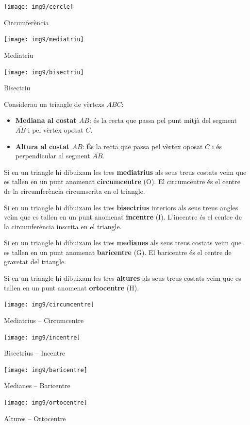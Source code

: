 \begin{theorybox}
		
		\begin{multicols}{3}
			\footnotesize
			\centering
			
			\texttt{[image: img9/cercle]}
			
			Circumferència
			
			\texttt{[image: img9/mediatriu]}
			
			Mediatriu
			
			\texttt{[image: img9/bisectriu]}
			
			Bisectriu
		\end{multicols}

\end{theorybox}

\pagebreak

\begin{theorybox}
	Considerau un triangle de vèrtexs $ABC$:
	\begin{itemize}	
		\item \textbf{Mediana al costat $AB$}: és la recta que passa pel punt mitjà del segment $\overline{AB}$ i pel vèrtex oposat $C$.
		
		\item \textbf{Altura al costat $AB$}: És la recta que passa pel vèrtex oposat $C$ i és perpendicular al segment $\overline{AB}$.
	\end{itemize}
	
	Si en un triangle hi dibuixam les tres \textbf{mediatrius} als seus treus costats veim que es tallen en un punt anomenat \textbf{circumcentre} (O). El circumcentre és el centre de la circumferència circumscrita en el triangle.
	
	Si en un triangle hi dibuixam les tres \textbf{bisectrius} interiors als seus treus angles veim que es tallen en un punt anomenat \textbf{incentre} (I). L'incentre és el centre de la circumferència inscrita en el triangle.
	
	Si en un triangle hi dibuixam les tres \textbf{medianes} als seus treus costats veim que es tallen en un punt anomenat \textbf{baricentre} (G). El baricentre és el centre de gravetat del triangle.
	
	Si en un triangle hi dibuixam les tres \textbf{altures} als seus treus costats veim que es tallen en un punt anomenat \textbf{ortocentre} (H). 
	
	\begin{multicols}{2}
		\footnotesize
		\centering
		
		\texttt{[image: img9/circumcentre]}
		
		Mediatrius -- Circumcentre
		
		\texttt{[image: img9/incentre]}
		
		Bisectrius -- Incentre
		
		\texttt{[image: img9/baricentre]}
		
		Medianes -- Baricentre
		
		
		\texttt{[image: img9/ortocentre]}
		
		Altures -- Ortocentre
		
	\end{multicols}
	
\end{theorybox}
 
